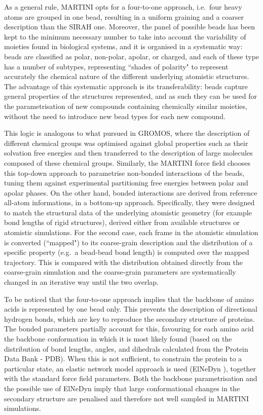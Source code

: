 As a general rule, MARTINI opts for a four-to-one approach, i.e.\ four heavy atoms are grouped in one bead, resulting in a uniform graining and a coarser description than the SIRAH one. Moreover, the panel of possible beads has been kept to the minimum necessary number to take into account the variability of moieties found in biological systems, and it is organised in a systematic way: beads are classified as polar, non-polar, apolar, or charged, and each of these type has a number of subtypes, representing ``shades of polarity" to represent accurately the chemical nature of the different underlying atomistic structures.
%
The advantage of this systematic approach is its transferability: beads capture general properties of the structures represented, and as such they can be used for the parametrisation of new compounds containing chemically similar moieties, without the need to introduce new bead types for each new compound.

This logic is analogous to what pursued in GROMOS, where the description of different chemical groups was optimised against global properties such as their solvation free energies and then transferred to the description of large molecules composed of these chemical groups.
%
Similarly, the MARTINI force field chooses this top-down approach to parametrise non-bonded interactions of the beads, tuning them against experimental partitioning free energies between polar and apolar phases. On the other hand, bonded interactions are derived from reference all-atom informations, in a bottom-up approach.
%
Specifically, they were designed to match the structural data of the underlying atomistic geometry (for example bond lengths of rigid structures), derived either from available structures or atomistic simulations. For the second case, each frame in the atomistic simulation is converted (``mapped") to its coarse-grain description and the distribution of a specific property (e.g.\ a bead-bead bond length) is computed over the mapped trajectory. This is compared with the distribution obtained directly from the coarse-grain simulation and the coarse-grain parameters are systematically changed in an iterative way until the two overlap.

To be noticed that the four-to-one approach implies that the backbone of amino acids is represented by one bead only. This prevents the description of directional hydrogen bonds, which are key to reproduce the secondary structure of proteins. The bonded parameters partially account for this, favouring for each amino acid the backbone conformation in which it is most likely found (based on the distribution of bond lengths, angles, and dihedrals calculated from the Protein Data Bank - PDB). When this is not sufficient, to constrain the protein to a particular state, an elastic network model approach is used (ElNeDyn \cite{elnedyn}), together with the standard force field parameters. Both the backbone parametrisation and the possible use of ElNeDyn imply that large conformational changes in the secondary structure are penalised and therefore not well sampled in MARTINI simulations.

